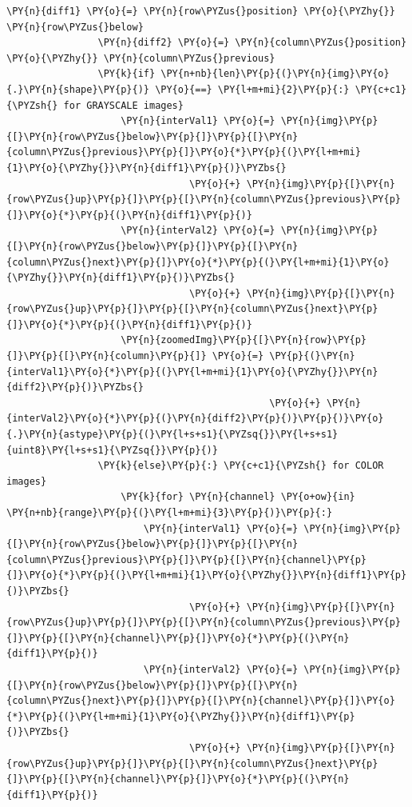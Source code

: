 \documentclass[a4paper,10pt]{article}%
\begin{document}
\begin{tcolorbox}[breakable, size=fbox, boxrule=1pt, pad at break*=1mm,colback=cellbackground, colframe=cellborder]
\begin{Verbatim}[commandchars=\\\{\}]
                \PY{n}{diff1} \PY{o}{=} \PY{n}{row\PYZus{}position} \PY{o}{\PYZhy{}} \PY{n}{row\PYZus{}below} 
                \PY{n}{diff2} \PY{o}{=} \PY{n}{column\PYZus{}position} \PY{o}{\PYZhy{}} \PY{n}{column\PYZus{}previous}
                \PY{k}{if} \PY{n+nb}{len}\PY{p}{(}\PY{n}{img}\PY{o}{.}\PY{n}{shape}\PY{p}{)} \PY{o}{==} \PY{l+m+mi}{2}\PY{p}{:} \PY{c+c1}{\PYZsh{} for GRAYSCALE images}
                    \PY{n}{interVal1} \PY{o}{=} \PY{n}{img}\PY{p}{[}\PY{n}{row\PYZus{}below}\PY{p}{]}\PY{p}{[}\PY{n}{column\PYZus{}previous}\PY{p}{]}\PY{o}{*}\PY{p}{(}\PY{l+m+mi}{1}\PY{o}{\PYZhy{}}\PY{n}{diff1}\PY{p}{)}\PYZbs{}
                                \PY{o}{+} \PY{n}{img}\PY{p}{[}\PY{n}{row\PYZus{}up}\PY{p}{]}\PY{p}{[}\PY{n}{column\PYZus{}previous}\PY{p}{]}\PY{o}{*}\PY{p}{(}\PY{n}{diff1}\PY{p}{)}
                    \PY{n}{interVal2} \PY{o}{=} \PY{n}{img}\PY{p}{[}\PY{n}{row\PYZus{}below}\PY{p}{]}\PY{p}{[}\PY{n}{column\PYZus{}next}\PY{p}{]}\PY{o}{*}\PY{p}{(}\PY{l+m+mi}{1}\PY{o}{\PYZhy{}}\PY{n}{diff1}\PY{p}{)}\PYZbs{}
                                \PY{o}{+} \PY{n}{img}\PY{p}{[}\PY{n}{row\PYZus{}up}\PY{p}{]}\PY{p}{[}\PY{n}{column\PYZus{}next}\PY{p}{]}\PY{o}{*}\PY{p}{(}\PY{n}{diff1}\PY{p}{)}
                    \PY{n}{zoomedImg}\PY{p}{[}\PY{n}{row}\PY{p}{]}\PY{p}{[}\PY{n}{column}\PY{p}{]} \PY{o}{=} \PY{p}{(}\PY{n}{interVal1}\PY{o}{*}\PY{p}{(}\PY{l+m+mi}{1}\PY{o}{\PYZhy{}}\PY{n}{diff2}\PY{p}{)}\PYZbs{}
                                              \PY{o}{+} \PY{n}{interVal2}\PY{o}{*}\PY{p}{(}\PY{n}{diff2}\PY{p}{)}\PY{p}{)}\PY{o}{.}\PY{n}{astype}\PY{p}{(}\PY{l+s+s1}{\PYZsq{}}\PY{l+s+s1}{uint8}\PY{l+s+s1}{\PYZsq{}}\PY{p}{)}
                \PY{k}{else}\PY{p}{:} \PY{c+c1}{\PYZsh{} for COLOR images}
                    \PY{k}{for} \PY{n}{channel} \PY{o+ow}{in} \PY{n+nb}{range}\PY{p}{(}\PY{l+m+mi}{3}\PY{p}{)}\PY{p}{:}
                        \PY{n}{interVal1} \PY{o}{=} \PY{n}{img}\PY{p}{[}\PY{n}{row\PYZus{}below}\PY{p}{]}\PY{p}{[}\PY{n}{column\PYZus{}previous}\PY{p}{]}\PY{p}{[}\PY{n}{channel}\PY{p}{]}\PY{o}{*}\PY{p}{(}\PY{l+m+mi}{1}\PY{o}{\PYZhy{}}\PY{n}{diff1}\PY{p}{)}\PYZbs{}
                                \PY{o}{+} \PY{n}{img}\PY{p}{[}\PY{n}{row\PYZus{}up}\PY{p}{]}\PY{p}{[}\PY{n}{column\PYZus{}previous}\PY{p}{]}\PY{p}{[}\PY{n}{channel}\PY{p}{]}\PY{o}{*}\PY{p}{(}\PY{n}{diff1}\PY{p}{)}
                        \PY{n}{interVal2} \PY{o}{=} \PY{n}{img}\PY{p}{[}\PY{n}{row\PYZus{}below}\PY{p}{]}\PY{p}{[}\PY{n}{column\PYZus{}next}\PY{p}{]}\PY{p}{[}\PY{n}{channel}\PY{p}{]}\PY{o}{*}\PY{p}{(}\PY{l+m+mi}{1}\PY{o}{\PYZhy{}}\PY{n}{diff1}\PY{p}{)}\PYZbs{}
                                \PY{o}{+} \PY{n}{img}\PY{p}{[}\PY{n}{row\PYZus{}up}\PY{p}{]}\PY{p}{[}\PY{n}{column\PYZus{}next}\PY{p}{]}\PY{p}{[}\PY{n}{channel}\PY{p}{]}\PY{o}{*}\PY{p}{(}\PY{n}{diff1}\PY{p}{)}

\end{Verbatim}
\end{tcolorbox}
\end{document}
